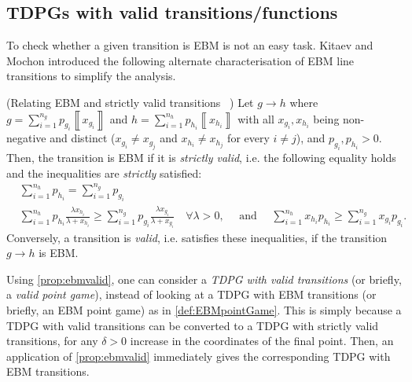 \documentclass{theoretics}
\begin{document}
%
%


\subsection{TDPGs with valid transitions/functions}
\label{subsec:tdpgvalid}
To check whether a given transition is EBM is not an easy task. Kitaev and Mochon \cite{Mochon07} introduced the following
alternate characterisation of EBM line
transitions to simplify the analysis.
%

\begin{proposition}(Relating EBM and strictly valid transitions ~\cite{Mochon07,ACG+14})
  \label{prop:ebmvalid}
  Let $g\to h$ where $g=\sum_{i=1}^{n_{g}}p_{g_{i}}\left\llbracket x_{g_{i}}\right\rrbracket $
  and $h=\sum_{i=1}^{n_{h}}p_{h_{i}}\left\llbracket x_{h_{i}}\right\rrbracket $
  with all $x_{g_{i}},x_{h_{i}}$ being non-negative and distinct ($x_{g_{i}}\neq x_{g_{j}}$
  and $x_{h_{i}}\neq x_{h_{j}}$ for every $i\neq j$), and $p_{g_{i}},p_{h_{i}}>0$. Then, the transition is EBM if it is \emph{strictly
    valid}, i.e. the following equality holds and the inequalities are
  \emph{strictly} satisfied:
  \begin{align*}
     & \sum_{i=1}^{n_{h}}p_{h_{i}}  =\sum_{i=1}^{n_{g}}p_{g_{i}}                                                                                                                                       \\
     & \sum_{i=1}^{n_{h}}p_{h_{i}}\frac{\lambda x_{h_{i}}}{\lambda+x_{h_{i}}}  \ge\sum_{i=1}^{n_{g}}p_{g_{i}}\frac{\lambda x_{g_{i}}}{\lambda+x_{g_{i}}} \quad\forall\lambda>0, \quad\text{ and }\quad
    \sum_{i=1}^{n_{h}}x_{h_{i}}p_{h_{i}}  \ge\sum_{i=1}^{n_{g}}x_{g_{i}}p_{g_{i}}.
  \end{align*}
  Conversely, a transition is \emph{valid}, i.e. satisfies these inequalities, if the transition $g\to h$ is EBM.
\end{proposition}

%
%
%
%
%
%
%
%
%

%
Using \cref{prop:ebmvalid}, one can consider a \emph{TDPG with valid transitions} (or briefly, a \emph{valid point game}), instead of looking at a TDPG with EBM transitions (or briefly, an EBM point game) as in \cref{def:EBMpointGame}. This is simply because a TDPG with valid transitions can be converted to a TDPG with strictly valid transitions, for any $\delta>0$ increase in the coordinates of the final point. Then, an application of \cref{prop:ebmvalid} immediately gives the corresponding TDPG with EBM transitions.
\end{document}
